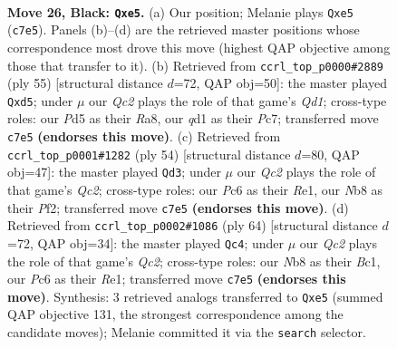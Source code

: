 \documentclass[11pt]{article}
\begin{document}
\clearpage

\begin{figure}[p]\centering
\begin{subfigure}{0.46\textwidth}\centering
\resizebox{\linewidth}{!}{%
\newchessgame
\chessboard[
  setfen={rnb5/p1q2k2/2p1p1p1/P1PpP1P1/1P5N/2P5/5K2/R1BQ4 b - - 6 26},
  showmover=false,
  pgfstyle=straightmove, color=movearrow, markmove={c7-e5}
]}
\caption{}
\end{subfigure}\hfill
\begin{subfigure}{0.46\textwidth}\centering
\resizebox{\linewidth}{!}{%
\newchessgame
\chessboard[
  setfen={r2q2k1/2p3p1/1p5p/1P1Pp2P/p2b2P1/P2B2Q1/1P6/1K1R4 b - - 0 28},
  showmover=false,
  pgfstyle=straightmove, color=movearrow, markmove={d8-d5}
]}
\caption{}
\end{subfigure}
\\[4pt]
\begin{subfigure}{0.46\textwidth}\centering
\resizebox{\linewidth}{!}{%
\newchessgame
\chessboard[
  setfen={1r4k1/3q1pb1/3p2p1/2pP3p/4P3/1P2B2P/2Q2PP1/4R1K1 w - - 0 28},
  showmover=false,
  pgfstyle=straightmove, color=movearrow, markmove={c2-d3}
]}
\caption{}
\end{subfigure}\hfill
\begin{subfigure}{0.46\textwidth}\centering
\resizebox{\linewidth}{!}{%
\newchessgame
\chessboard[
  setfen={r4bk1/3q1p2/6p1/2pP3p/pp5P/1P4P1/P1Q2PK1/2B1R3 w - - 3 33},
  showmover=false,
  pgfstyle=straightmove, color=movearrow, markmove={c2-c4}
]}
\caption{}
\end{subfigure}
\caption{\textbf{Move 26, Black: \texttt{Qxe5}.} (a) Our position; Melanie plays \texttt{Qxe5} (\texttt{c7e5}). Panels (b)--(d) are the retrieved master positions whose correspondence most drove this move (highest QAP objective among those that transfer to it). (b) Retrieved from \texttt{ccrl\_top\_p0000\#2889} (ply 55) [structural distance $d$=72, QAP obj=50]: the master played \texttt{Qxd5}; under $\mu$ our \emph{Qc2} plays the role of that game's \emph{Qd1}; cross-type roles: our \emph{P}d5 as their \emph{R}a8, our \emph{q}d1 as their \emph{P}c7; transferred move \texttt{c7e5} \textbf{(endorses this move)}. (c) Retrieved from \texttt{ccrl\_top\_p0001\#1282} (ply 54) [structural distance $d$=80, QAP obj=47]: the master played \texttt{Qd3}; under $\mu$ our \emph{Qc2} plays the role of that game's \emph{Qc2}; cross-type roles: our \emph{P}c6 as their \emph{R}e1, our \emph{N}b8 as their \emph{P}f2; transferred move \texttt{c7e5} \textbf{(endorses this move)}. (d) Retrieved from \texttt{ccrl\_top\_p0002\#1086} (ply 64) [structural distance $d$=72, QAP obj=34]: the master played \texttt{Qc4}; under $\mu$ our \emph{Qc2} plays the role of that game's \emph{Qc2}; cross-type roles: our \emph{N}b8 as their \emph{B}c1, our \emph{P}c6 as their \emph{R}e1; transferred move \texttt{c7e5} \textbf{(endorses this move)}. Synthesis: 3 retrieved analogs transferred to \texttt{Qxe5} (summed QAP objective 131, the strongest correspondence among the candidate moves); Melanie committed it via the \texttt{search} selector.}
\label{fig:thought-m51}
\end{figure}
\end{document}
